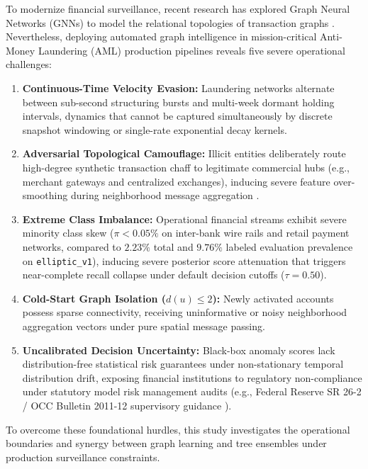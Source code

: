 To modernize financial surveillance, recent research has explored Graph Neural Networks (GNNs) to model the relational topologies of transaction graphs \citep{kipf2017semi, hamilton2017inductive, weber2019anti, hu2020heterogeneous}. Nevertheless, deploying automated graph intelligence in mission-critical Anti-Money Laundering (AML) production pipelines reveals five severe operational challenges:
\begin{enumerate}
    \item \textbf{Continuous-Time Velocity Evasion:} Laundering networks alternate between sub-second structuring bursts and multi-week dormant holding intervals, dynamics that cannot be captured simultaneously by discrete snapshot windowing \citep{pareja2020evolvegcn} or single-rate exponential decay kernels.
    \item \textbf{Adversarial Topological Camouflage:} Illicit entities deliberately route high-degree synthetic transaction chaff to legitimate commercial hubs (e.g., merchant gateways and centralized exchanges), inducing severe feature over-smoothing during neighborhood message aggregation \citep{dou2020enhancing}.
    \item \textbf{Extreme Class Imbalance:} Operational financial streams exhibit severe minority class skew ($\pi < 0.05\%$ on inter-bank wire rails and retail payment networks, compared to $2.23\%$ total and $9.76\%$ labeled evaluation prevalence on \texttt{elliptic\_v1}), inducing severe posterior score attenuation that triggers near-complete recall collapse under default decision cutoffs ($\tau = 0.50$).
    \item \textbf{Cold-Start Graph Isolation ($d(u) \le 2$):} Newly activated accounts possess sparse connectivity, receiving uninformative or noisy neighborhood aggregation vectors under pure spatial message passing.
    \item \textbf{Uncalibrated Decision Uncertainty:} Black-box anomaly scores lack distribution-free statistical risk guarantees under non-stationary temporal distribution drift, exposing financial institutions to regulatory non-compliance under statutory model risk management audits (e.g., Federal Reserve SR 26-2 / OCC Bulletin 2011-12 supervisory guidance \citep{fed2026sr262, occ201112}).
\end{enumerate}

To overcome these foundational hurdles, this study investigates the operational boundaries and synergy between graph learning and tree ensembles under production surveillance constraints.

